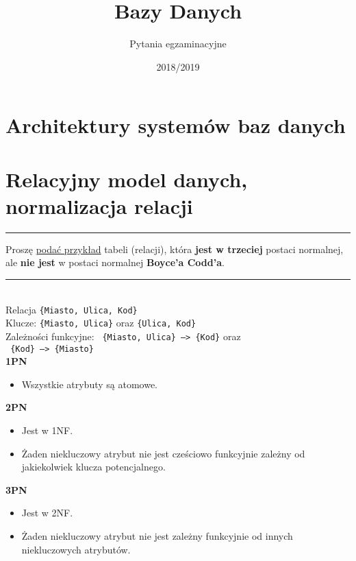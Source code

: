 \documentclass[a5paper,6pt]{article}
\title{Bazy Danych}
\author{Pytania egzaminacyjne}
\date{2018/2019}
\newcommand{\horrule}[1]{\rule{\linewidth}{#1}}
\begin{document}
    \maketitle
    \tableofcontents
    \pagebreak

    \section{Architektury systemów baz danych} %
    \label{sec:architektury_systemow}


    \section{Relacyjny model danych, normalizacja relacji} %
    \label{sec:relacyjny_model_danych_normalizacja_relacji}

    \horrule{0.5pt}
    Proszę \underline{podać przykład} tabeli (relacji), która \textbf{jest w
    trzeciej} postaci normalnej, ale \textbf{nie jest} w postaci normalnej
    \textbf{Boyce’a Codd’a}.\\
    \horrule{0.5pt}\\

    Relacja \texttt{\{Miasto, Ulica, Kod\}}\\
    Klucze: \texttt{\{Miasto, Ulica\}} oraz \texttt{\{Ulica, Kod\}}\\
    Zależności funkcyjne: \texttt{ \{Miasto, Ulica\} --> \{Kod\}} oraz\\
                          \texttt{ \{Kod\} --> \{Miasto\}}\\

    \textbf{1PN}
    \begin{itemize}
        \item Wszystkie atrybuty są atomowe.
    \end{itemize}

    \textbf{2PN}
    \begin{itemize}
        \item Jest w 1NF.
        \item Żaden niekluczowy atrybut nie jest
              cześciowo funkcyjnie zależny od jakiekolwiek klucza potencjalnego.
    \end{itemize}

    \textbf{3PN}
    \begin{itemize}
        \item Jest w 2NF.
        \item Żaden niekluczowy atrybut nie jest zależny
              funkcyjnie od innych niekluczowych atrybutów.
    \end{itemize}
\end{document}
